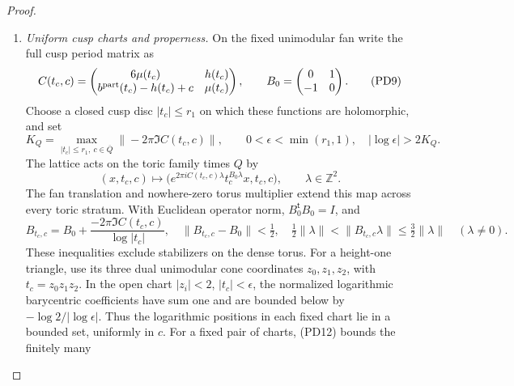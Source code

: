 \begin{proof}
\begin{enumerate}[label=\arabic*.,leftmargin=*]
At a finite root chart the family action is
\[
 (z,c,\zeta)\longmapsto
 \left(g_jz,c,R_{g_j}(z)\zeta+
             \Pi(g_jz,c)\frac{v_j}{m_j}\right),
 \qquad (m_1,m_2)=(3,4).
 \tag{PD7}
\]
In the real marking it is $(z,c,u)\mapsto(g_jz,c,A_ju+v_j/m_j)$.
The invariant-covector freeness test in \cref{fam:src:A.1.2}
is independent of $c$, so these quotients are local biholomorphisms
and submersions to $Q$. The same parallelotope proves properness
over the finite base disc times $Q$. Their punctured connectors are
\[
 \frac{\log s_j(z)}{2\pi i}\Pi(z,c)v_j.
 \tag{PD8}
\]
A logarithm change adds a period, so this is a jointly holomorphic
torus section. Substitution in the finite affine action gives the
overlap conjugacy used in the preceding local maps.

\item \emph{Uniform cusp charts and properness.}
On the fixed unimodular fan write the full cusp period matrix as
\[
 C(t_c,c)=\begin{pmatrix}6\mu(t_c)&h(t_c)\\
 b^{\rm part}(t_c)-h(t_c)+c&\mu(t_c)\end{pmatrix},
 \qquad B_0=\begin{pmatrix}0&1\\-1&0\end{pmatrix}.
 \tag{PD9}
\]
Choose a closed cusp disc $|t_c|\le r_1$ on which these functions
are holomorphic, and set
\[
 K_Q=\max_{|t_c|\le r_1,\ c\in\overline Q}
               \|-2\pi\Im C(t_c,c)\|,
 \qquad 0<\epsilon<\min(r_1,1),\quad
               |\log\epsilon|>2K_Q.
 \tag{PD10}
\]
The lattice acts on the toric family times $Q$ by
\[
 (x,t_c,c)\longmapsto
 \bigl(e^{2\pi iC(t_c,c)\lambda}t_c^{B_0\lambda}x,t_c,c\bigr),
 \qquad\lambda\in\mathbb Z^2.
 \tag{PD11}
\]
The fan translation and nowhere-zero torus multiplier extend this
map across every toric stratum. With Euclidean operator norm,
$B_0^{\mathsf t}B_0=I$, and
\[
 B_{t_c,c}=B_0+\frac{-2\pi\Im C(t_c,c)}{\log|t_c|},
 \quad \|B_{t_c,c}-B_0\|<\tfrac12,
 \quad \tfrac12\|\lambda\|<\|B_{t_c,c}\lambda\|
                    \le\tfrac32\|\lambda\|\quad(\lambda\ne0).
 \tag{PD12}
\]
These inequalities exclude stabilizers on the dense torus.
For a height-one triangle, use its three dual unimodular cone
coordinates $z_0,z_1,z_2$, with $t_c=z_0z_1z_2$.
In the open chart $|z_i|<2$, $|t_c|<\epsilon$, the normalized
logarithmic barycentric coefficients have sum one and are bounded
below by $-\log2/|\log\epsilon|$. Thus the logarithmic positions
in each fixed chart lie in a bounded set, uniformly in $c$.
For a fixed pair of charts, (PD12) bounds the finitely many

\end{enumerate}
\end{proof}
